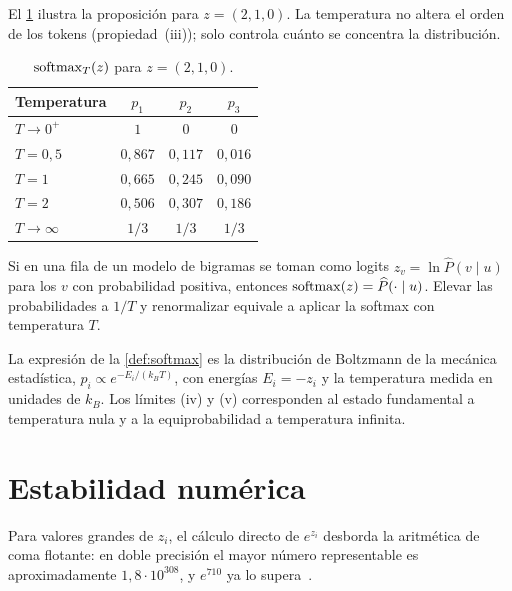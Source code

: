 El \cref{tab:temperatura} ilustra la proposición para $z=(2,1,0)$. La temperatura no altera el orden de los tokens (propiedad~(iii)); solo controla cuánto se concentra la distribución.

\begin{table}[h]
\centering\small
\caption{$\operatorname{softmax}_T(z)$ para $z=(2,1,0)$.}\label{tab:temperatura}
\begin{tabular}{@{}lccc@{}}
\toprule
Temperatura & $p_1$ & $p_2$ & $p_3$ \\
\midrule
$T\to 0^{+}$ & $1$ & $0$ & $0$ \\
$T=0{,}5$ & $0{,}867$ & $0{,}117$ & $0{,}016$ \\
$T=1$ & $0{,}665$ & $0{,}245$ & $0{,}090$ \\
$T=2$ & $0{,}506$ & $0{,}307$ & $0{,}186$ \\
$T\to\infty$ & $1/3$ & $1/3$ & $1/3$ \\
\bottomrule
\end{tabular}
\end{table}

\begin{observacion}
Si en una fila de un modelo de bigramas se toman como logits $z_v=\ln\widehat{P}(v\mid u)$ para los $v$ con probabilidad positiva, entonces $\operatorname{softmax}(z)=\widehat{P}(\cdot\mid u)$. Elevar las probabilidades a $1/T$ y renormalizar equivale a aplicar la softmax con temperatura $T$.
\end{observacion}

\begin{observacion}
La expresión de la \cref{def:softmax} es la distribución de Boltzmann de la mecánica estadística, $p_i\propto e^{-E_i/(k_BT)}$, con energías $E_i=-z_i$ y la temperatura medida en unidades de $k_B$. Los límites (iv) y (v) corresponden al estado fundamental a temperatura nula y a la equiprobabilidad a temperatura infinita.
\end{observacion}

\section{Estabilidad numérica}

Para valores grandes de $z_i$, el cálculo directo de $e^{z_i}$ desborda la aritmética de coma flotante: en doble precisión el mayor número representable es aproximadamente $1{,}8\cdot 10^{308}$, y $e^{710}$ ya lo supera~\cite[§4.1]{gbc}.

